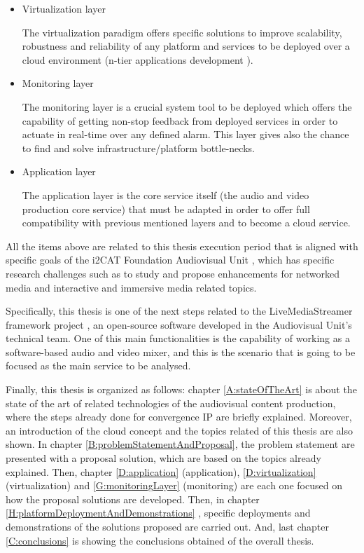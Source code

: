 \begin{itemize}
\item Virtualization layer \hfill 

The virtualization paradigm offers specific solutions to improve scalability, robustness and reliability of any platform and services to be deployed over a cloud environment (n-tier applications development \cite{n-tier architecture}). 

\item Monitoring layer \hfill 

The monitoring layer is a crucial system tool to be deployed which offers the capability of getting non-stop feedback from deployed services in order to actuate in real-time over any defined alarm. This layer gives also the chance to find and solve infrastructure/platform bottle-necks.

\item Application layer \hfill 

The application layer is the core service itself (the audio and video production core service) that must be adapted in order to offer full compatibility with previous mentioned layers and to become a cloud service.

\end{itemize}

All the items above are related to this thesis execution period that is aligned with specific goals of the i2CAT Foundation Audiovisual Unit \cite{i2catua}, which has specific research challenges such as to study and propose enhancements for networked media and interactive and immersive media related topics. 

Specifically, this thesis is one of the next steps related to the LiveMediaStreamer framework project \cite{lmsGITHUB}, an open-source software developed in the Audiovisual Unit's technical team. One of this main functionalities is the capability of working as a software-based audio and video mixer, and this is the scenario that is going to be focused as the main service to be analysed.

Finally, this thesis is organized as follows: chapter \ref{A:stateOfTheArt} is about the state of the art of related technologies of the audiovisual content production, where the steps already done for convergence IP are briefly explained. Moreover, an introduction of the cloud concept and the topics related of this thesis are also shown. In chapter \ref{B:problemStatementAndProposal}, the problem statement are presented with a proposal solution, which are based on the topics already explained. Then, chapter \ref{D:application} (application), \ref{D:virtualization} (virtualization) and \ref{G:monitoringLayer} (monitoring) are each one focused on how the proposal solutions are developed. Then, in chapter \ref{H:platformDeploymentAndDemonstrations}
, specific deployments and demonstrations of the solutions proposed are carried out. And, last chapter \ref{C:conclusions} is showing the conclusions obtained of the overall thesis.





